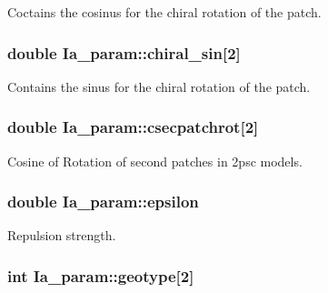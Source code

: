 Coctains the cosinus for the chiral rotation of the patch. 

\hypertarget{class_ia__param_a569adcf853f7e6f7ccf0515928249bb6}{
\subsubsection[{chiral\+\_\+sin}]{\setlength{\rightskip}{0pt plus 5cm}double Ia\+\_\+param\+::chiral\+\_\+sin\mbox{[}2\mbox{]}}}\label{class_ia__param_a569adcf853f7e6f7ccf0515928249bb6}


Contains the sinus for the chiral rotation of the patch. 

\hypertarget{class_ia__param_a7f94789a785201573c04d8c5e71dc9fa}{
\subsubsection[{csecpatchrot}]{\setlength{\rightskip}{0pt plus 5cm}double Ia\+\_\+param\+::csecpatchrot\mbox{[}2\mbox{]}}}\label{class_ia__param_a7f94789a785201573c04d8c5e71dc9fa}


Cosine of Rotation of second patches in 2psc models. 

\hypertarget{class_ia__param_afc12bb1527874046f8d8a5769493b142}{
\subsubsection[{epsilon}]{\setlength{\rightskip}{0pt plus 5cm}double Ia\+\_\+param\+::epsilon}}\label{class_ia__param_afc12bb1527874046f8d8a5769493b142}


Repulsion strength. 

\hypertarget{class_ia__param_a3ff31140f1898b4792a39745eec89a2e}{
\subsubsection[{geotype}]{\setlength{\rightskip}{0pt plus 5cm}int Ia\+\_\+param\+::geotype\mbox{[}2\mbox{]}}}\label{class_ia__param_a3ff31140f1898b4792a39745eec89a2e}


